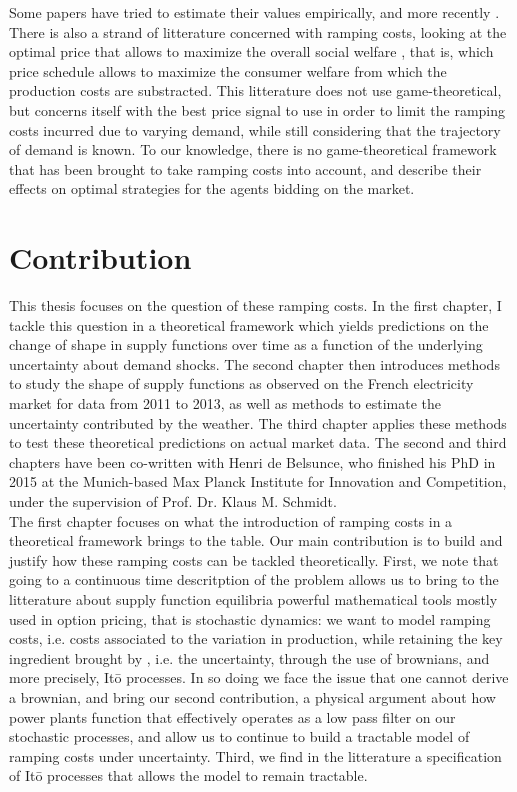 Some papers have tried to estimate their values empirically, \cite{wolak2007quantifying} and more recently \cite{reguant2011welfare}. There is also a strand of litterature concerned with ramping costs, looking at the optimal price that allows to maximize the overall social welfare \cite{tanaka2006real}, that is, which price schedule allows to maximize the consumer welfare from which the production costs are substracted. This litterature does not use game-theoretical, but concerns itself with the best price signal to use in order to limit the ramping costs incurred due to varying demand, while still considering that the trajectory of demand is known. To our knowledge, there is no game-theoretical framework that has been brought to take ramping costs into account, and describe their effects on optimal strategies for the agents bidding on the market. 

\section*{Contribution}

This thesis focuses on the question of these ramping costs. In the first chapter, I tackle this question in a theoretical framework which yields predictions on the change of shape in supply functions over time as a function of the underlying uncertainty about demand shocks. The second chapter then introduces methods to study the shape of supply functions as observed on the French electricity market for data from 2011 to 2013, as well as methods to estimate the uncertainty contributed by the weather. The third chapter applies these methods to test these theoretical predictions on actual market data. The second and third chapters have been co-written with Henri de Belsunce, who finished his PhD in 2015 at the Munich-based Max Planck Institute for Innovation and Competition, under the supervision of Prof. Dr. Klaus M. Schmidt.\\

The first chapter focuses on what the introduction of ramping costs in a theoretical framework brings to the table. Our main contribution is to build and justify how these ramping costs can be tackled theoretically. First, we note that going to a continuous time descritption of the problem allows us to bring to the litterature about supply function equilibria powerful mathematical tools mostly used in option pricing, that is stochastic dynamics: we want to model ramping costs, i.e. costs associated to the variation in production, while retaining the key ingredient brought by \cite{KM}, i.e. the uncertainty, through the use of brownians, and more precisely, It\={o} processes. In so doing we face the issue that one cannot derive a brownian, and bring our second contribution, a physical argument about how power plants function that effectively operates as a low pass filter on our stochastic processes, and allow us to continue to build a tractable model of ramping costs under uncertainty. Third, we find in the litterature a specification of It\={o} processes that allows the model to remain tractable. \\

